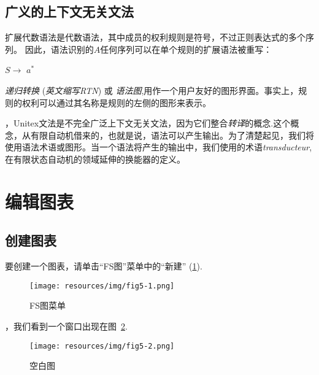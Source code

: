 \subsection{广义的上下文无关文法}

   扩展代数语法是代数语法，其中成员的权利规则是符号，不过正则表达式的多个序列。  因此，语法识别的$ A $任何序列可以在单个规则的扩展语法被重写：


\bigskip $S \rightarrow$ $a^{*}$

\bigskip
{}\textit{递归转换} (\textit{英文缩写RTN}) 或 \textit{语法图},用作一个用户友好的图形界面。事实上，规则的权利可以通过其名称是规则的左侧的图形来表示。


\bigskip
{}，Unitex文法是不完全广泛上下文无关文法，因为它们整合\textit{转译}的概念.这个概念，从有限自动机借来的，也就是说，语法可以产生输出。为了清楚起见，我们将使用语法术语或图形。当一个语法将产生的输出中，我们使用的术语\textit{transducteur},
在有限状态自动机的领域延伸的换能器的定义。


\section{编辑图表}
\label{section-editing-graphs}

\subsection{创建图表}
要创建一个图表，请单击“FS图”菜单中的“新建” (\ref{fig-fsgraph-menu}).

\begin{figure}[!h]
\begin{center}
\texttt{[image: resources/img/fig5-1.png]}
\caption{FS图菜单\label{fig-fsgraph-menu}}
\end{center}
\end{figure}

\bigskip
{}，我们看到一个窗口出现在图~\ref{fig-new-graph}.

\begin{figure}[!h]
\begin{center}
\texttt{[image: resources/img/fig5-2.png]}
\caption{空白图\label{fig-new-graph}}
\end{center}
\end{figure}


